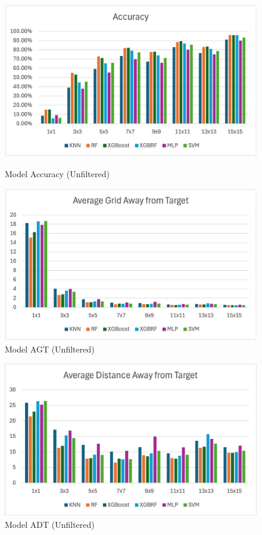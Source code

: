 \documentclass[runningheads]{llncs}
\begin{document}
\begin{figure}[tbh!]
	\centering
	\begin{minipage}{0.45\linewidth}
		\centering
		\includegraphics[width=\linewidth]{figures/overview_unfiltered_accuracy.png}
		\caption{Model Accuracy (Unfiltered)}
		\label{fig:acc_unfiltered}
	\end{minipage}
	\hfill
	\begin{minipage}{0.45\linewidth}
		\centering
		\includegraphics[width=\linewidth]{figures/overview_unfiltered_agt.png}
		\caption{Model AGT (Unfiltered)}
		\label{fig:agt_unfiltered}
	\end{minipage}
\end{figure}

\begin{figure}[tbh!]
	\centering
	\includegraphics[width=.45\linewidth]{figures/overview_unfiltered_adt.png}
	\caption{Model ADT (Unfiltered)}
	\label{fig:adt_unfiltered}
\end{figure}
\end{document}
